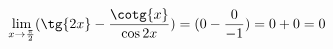 \begin{ex}
\begin{align}
&\lim_{x\rightarrow \frac{\pi}{2}} (\tg{2x}-\frac{\cotg{x}}{\cos{2x}})=(0-\frac{0}{-1})=0+0=0\nonumber
\end{align}
\end{ex}
